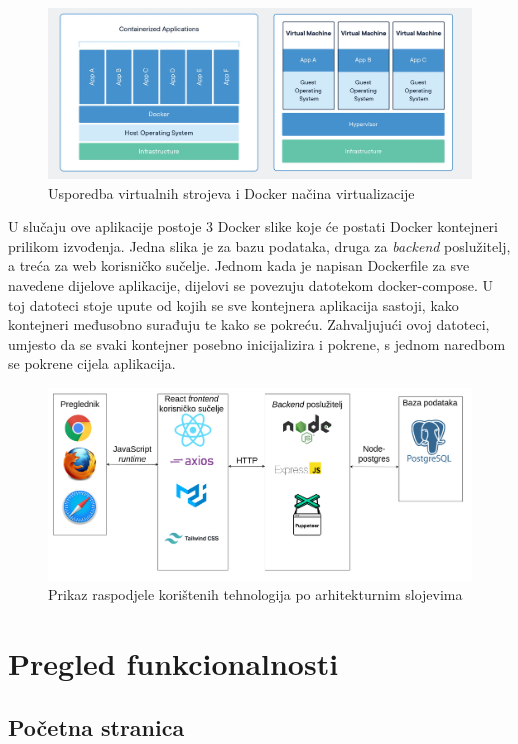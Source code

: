 \documentclass[times, utf8, zavrsni]{fer}
\begin{document}
\begin{figure}[htb]
    
    \includegraphics[scale=0.35]{slika2.png}
    \caption{Usporedba virtualnih strojeva i Docker načina virtualizacije}
    \label{fig:docker}
    \end{figure}

U slučaju ove aplikacije postoje 3 Docker slike koje će postati Docker kontejneri prilikom izvođenja. Jedna slika je za bazu podataka,
druga za \emph{backend} poslužitelj, a treća za web korisničko sučelje. Jednom kada je napisan Dockerfile za sve navedene dijelove aplikacije, dijelovi se povezuju  
datotekom docker-compose. U toj datoteci stoje upute od kojih se sve kontejnera aplikacija sastoji, kako kontejneri međusobno surađuju te kako se pokreću. Zahvaljujući 
ovoj datoteci, umjesto da se svaki kontejner posebno inicijalizira i pokrene, s jednom naredbom se pokrene cijela aplikacija.
\\
\begin{figure}[htb]
    \includegraphics[scale=0.3]{tehnologije.png}
    \caption{Prikaz raspodjele korištenih tehnologija po arhitekturnim slojevima}
    \label{fig:arhitektura}
    \end{figure}
\chapter{Pregled funkcionalnosti}
\section{Početna stranica}
\end{document}
